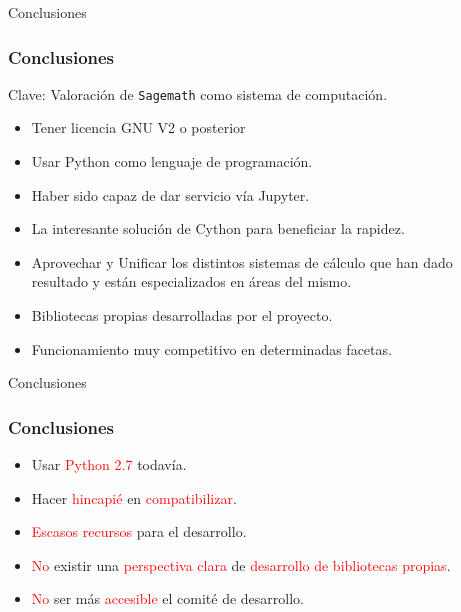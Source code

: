 \documentclass[dvipsnames]{beamer}
\begin{document}
\begin{frame}[fragile]{Conclusiones}
  \frametitle{Conclusiones}
  \begin{block}{Clave: Valoración de \texttt{Sagemath}}
      como sistema de computación.
  \end{block}\pause
  \begin{itemize}[<+->]
  \item Tener licencia \textcolor{OliveGreen}{GNU V2 o posterior}
  \item Usar \textcolor{OliveGreen}{Python} como lenguaje de programación.
  \item Haber sido capaz de dar servicio vía \textcolor{OliveGreen}{Jupyter}.
  \item La interesante solución de \textcolor{OliveGreen}{Cython} para
    beneficiar la rapidez.
  \item \textcolor{OliveGreen}{Aprovechar y Unificar} los distintos sistemas
    de cálculo que han dado resultado y están especializados en áreas
    del mismo.
  \item \textcolor{OliveGreen}{Bibliotecas propias} desarrolladas por el
    proyecto.
  \item Funcionamiento \textcolor{OliveGreen}{muy competitivo} en
    determinadas facetas.
  \end{itemize}
\end{frame}

\begin{frame}[fragile]{Conclusiones}
  \frametitle{Conclusiones}
  \begin{itemize}[<+->]
  \item Usar \textcolor{red}{Python 2.7} todavía.
  \item Hacer \textcolor{red}{hincapié} en \textcolor{red}{compatibilizar}.
  \item \textcolor{red}{Escasos recursos} para el desarrollo.
  \item \textcolor{red}{No} existir una \textcolor{red}{perspectiva
      clara} de \textcolor{red}{desarrollo de bibliotecas propias}.
  \item \textcolor{red}{No} ser más \textcolor{red}{accesible} el
    comité de desarrollo.
  \end{itemize}
\end{frame}
\end{document}
